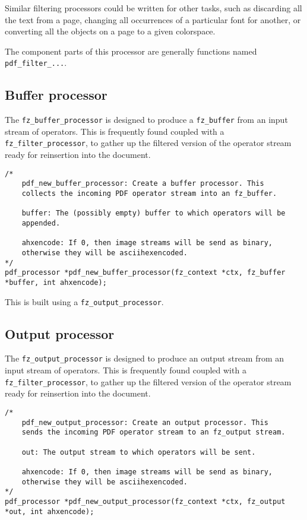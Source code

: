 \documentclass[oneside]{book}
\begin{document}
Similar filtering processors could be written for other tasks, such as discarding all the text from a page, changing all occurrences of a particular font for another, or converting all the objects on a page to a given colorspace.

The component parts of this processor are generally functions named \texttt{pdf\_filter\_...}.

\subsection{Buffer processor}

The \texttt{fz\_buffer\_processor} is designed to produce a \texttt{fz\_buffer} from an input stream of operators. This is frequently found coupled with a \texttt{fz\_filter\_processor}, to gather up the filtered version of the operator stream ready for reinsertion into the document.

\begin{lstlisting}
/*
	pdf_new_buffer_processor: Create a buffer processor. This
	collects the incoming PDF operator stream into an fz_buffer.

	buffer: The (possibly empty) buffer to which operators will be
	appended.

	ahxencode: If 0, then image streams will be send as binary,
	otherwise they will be asciihexencoded.
*/
pdf_processor *pdf_new_buffer_processor(fz_context *ctx, fz_buffer *buffer, int ahxencode);
\end{lstlisting}

This is built using a \texttt{fz\_output\_processor}.

\subsection{Output processor}

The \texttt{fz\_output\_processor} is designed to produce an output stream from an input stream of operators. This is frequently found coupled with a \texttt{fz\_filter\_processor}, to gather up the filtered version of the operator stream ready for reinsertion into the document.

\begin{lstlisting}
/*
	pdf_new_output_processor: Create an output processor. This
	sends the incoming PDF operator stream to an fz_output stream.

	out: The output stream to which operators will be sent.

	ahxencode: If 0, then image streams will be send as binary,
	otherwise they will be asciihexencoded.
*/
pdf_processor *pdf_new_output_processor(fz_context *ctx, fz_output *out, int ahxencode);
\end{lstlisting}
\end{document}
